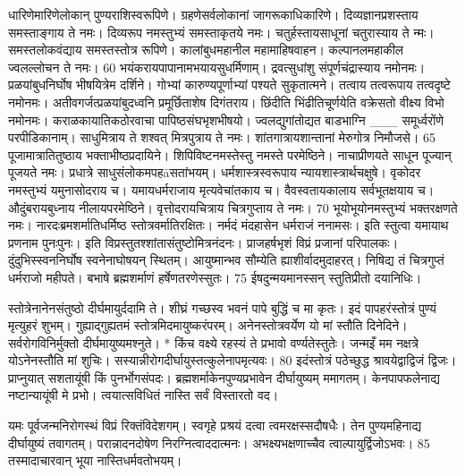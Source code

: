 धारिणेमारिणेलोकान् पुण्यराशिस्वरूपिणे।
 ग्रहणेसर्वलोकानां जागरूकाधिकारिणे।
 दिव्यज्ञानप्रशस्ताय समस्ताङ्गाय ते नमः।
 दिव्यरूप नमस्तुभ्यं समस्ताकृतये नमः।
 चतुर्हस्तायसाधूनां चतुरास्याय ते न्मः।
 समस्तलोकवंद्याय समस्तस्तोत्र रूपिणे।
 कालांबुधमहानील महामाहिषवाहन।
 कल्पानलमहाकील ज्वलल्लोचन ते नमः।
 60 भयंकरायपापानामभयायसुधर्मिणाम्।
 द्रवत्सुधांशु संपूर्णचंद्रास्याय नमोनमः।
 प्रळयांबुधनिर्घोष भीषयित्रेम दर्शिने।
 गोभ्यां कारुण्यपूर्णाभ्यां पश्यते सुकृतात्मने।
 तत्वाय तत्वरूपाय तत्वदृष्टे नमोनमः।
 अतीवगर्जत्प्रळयांबुदध्वनि
प्रमूर्छिताशेष दिगंतराय।
 छिंदीति भिंढीतिचूर्णयेति वक्रेसतो
वीक्ष्य विभो नमोनमः।
 कराळकायातिकठोरवाचा पापिष्ठसंघभृशभीषयो।
 ज्वलद्युगांतोद्यत बाडभाग्नि
___ समूर्ध्वरोंणे परपीडिकानाम्।
 साधुमित्राय ते शश्वत् मित्रपुत्राय ते नमः।
 शांतगात्रायशान्तानां मेरुगोत्र निमौजसे।
 65
पूजामात्रातितुष्ठाय भक्ताभीष्ठप्रदायिने।
 शिपिविष्टनमस्तेस्तु नमस्ते परमेष्ठिने।
 नाचाप्रीणयते साधून पूज्यान् पूजयते नमः।
 प्रधात्रे साधुसंलोकमपहāसतांभयम्।
 धर्मशास्त्रस्वरूपाय न्यायशास्त्रार्थचक्षुषे।
 वृकोदर नमस्तुभ्यं यमुनासोदराय च।
 यमायधर्मराजाय मृत्यवेचांतकाय च।
 वैवस्वतायकालाय सर्वभूतक्षयाय च।
 औदुंबरायबुध्नाय नीलायपरमेष्ठिने।
 वृत्तोदरायचित्राय चित्रगुप्ताय ते नमः।
 70 भूयोभूयोनमस्तुभ्यं भक्तरक्षणते नमः।
 नारदःब्रमशर्मातिधर्मिष्ठ स्तोत्रवर्मातिरक्षितः।
 नर्मदं मंदहासेन धर्मराजं ननामसः।
 इति स्तुत्वा यमायाथ प्रणनाम पुनःपुनः।
 इति विप्रस्तुतश्शांतासंतुष्टोमित्रनंदनः।
 प्राजहर्षभृशं विप्रं प्रजानां परिपालकः।
 दुंदुभिस्स्वननिर्घोष स्वनेनाघोषयन् स्थितम्।
 आयुष्मान्भव सौम्येति ह्याशीर्वादमुदाहरत्।
 निषिद्य तं चित्रगुप्तं धर्मराजो महीपते।
 बभाषे ब्रह्मशर्माणं हर्षेणतरणेस्सुतः।
 75 ईषदुन्मयमानस्सन् स्तुतिप्रीतो दयानिधिः।

स्तोत्रेनानेनसंतुष्ठो दीर्घमायुर्ददामि ते।
 शीघ्रं गच्छस्व भवनं पापे बुद्धिं च मा कृतः।
 इदं पापहरंस्तोत्रं पुण्यं मृत्युहरं शुभम्।
 गुह्याद्गुह्यतमं स्तोत्रमिदमायुष्करंपरम्।
 अनेनस्तोत्रवर्येण यो मां स्तौति दिनेदिने।
 सर्वरोगविनिर्मुक्तो दीर्घमायुष्यमश्नुते।
 * किंच वक्ष्ये रहस्यं ते प्रभावो वर्ण्यतेस्तुतेः।
 जन्मइँ मम नक्षत्रे योऽनेनस्तौति मां शुचिः।
 सस्यान्नीरोगदीर्घायुस्तत्कुलेनापमृत्यवः।
 80 इदंस्तोत्रं पठेच्छुद्ध श्रावयेद्वाद्विजं द्विजः।
 प्राप्नुयात् सशतायूंषी किं पुनर्भोगसंपदः।
 ब्रह्मशर्माकेनपुण्यप्रभावेन दीर्घायुष्यम् ममागतम्।
 केनपापफलेनाद्य नष्टान्यायूंषी मे प्रभो।
 त्वयात्सविधितं नास्ति सर्वं विस्तारतो वद।
 
यमः
पूर्वजन्मनिरोगस्थं विप्रं रिक्तंविदेशगम्।
 स्वगृहे प्रश्रयं दत्वा त्वमरक्षस्सदौषधैः।
 तेन पुण्यमहिनाद्य दीर्घायुष्यं तवागतम्।
 परान्नादनदोषेण निरग्नित्वाददात्मनः।
 अभक्ष्यभक्षणाच्चैव त्वाल्पायुर्द्विजोऽभवः।
 85 तस्मादाचारवान् भूया नास्तिधर्मवतोभयम्।

